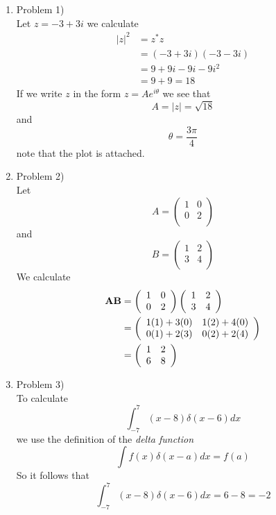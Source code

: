 \documentclass[11pt]{article}
\numberwithin{equation}{section}
\begin{document}


\begin{enumerate}
\item Problem 1)\\
Let $z = -3+3i$ we calculate
\begin{align*}
|z|^2 &= z^*z\\
&=(-3+3i)(-3-3i)\\
&= 9 + 9i - 9i - 9i^2\\
&= 9 + 9 = 18
\end{align*}
If we write $z$ in the form $z=Ae^{i\theta}$ we see that 
$$A = |z| = \sqrt{18}$$
and
$$\theta = \frac{3\pi}{4}$$
note that the plot is attached. 

\item Problem 2)\\
Let $$A = \left(\begin{array}{cc}
	1	&0\\
	0	&2\\
		\end{array}\right)$$
and
$$B = \left(\begin{array}{cc}
	1	&2\\
	3	&4\\
		\end{array}\right)$$
We calculate
\begin{align*}
\bold{A}\bold{B} &= 
\left(\begin{array}{cc}
	1	&0\\
	0	&2\\
		\end{array}\right)
\left(\begin{array}{cc}
	1	&2\\
	3	&4\\
		\end{array}\right)\\
&= \left(\begin{array}{cc}
	1(1)+3(0)	&1(2)+4(0)\\
	0(1)+2(3)	&0(2)+2(4)\\
		\end{array}\right)\\
&= \left(\begin{array}{cc}
	1	&2\\
	6	&8\\
		\end{array}\right)
\end{align*}

\item Problem 3)\\
To calculate 
$$\int_{-7}^{7}(x-8)\delta(x-6)dx$$
we use the definition of the \emph{delta function}
$$\int f(x)\delta(x-a)dx = f(a)$$
So it follows that
$$\int_{-7}^{7}(x-8)\delta(x-6)dx = 6-8 = -2$$


\end{enumerate}
\end{document}
